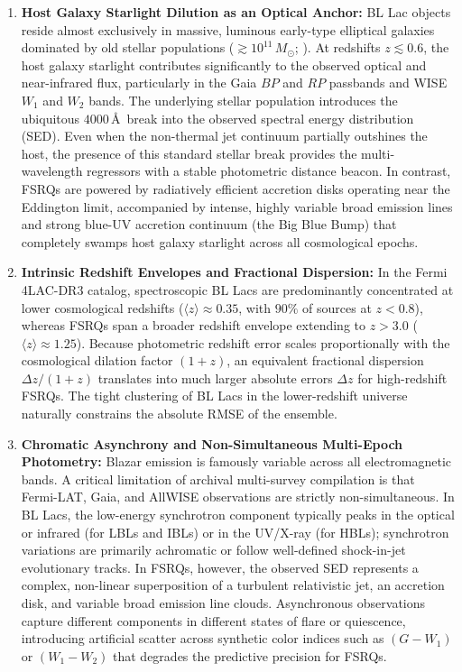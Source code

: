 \documentclass[twocolumn,linenumbers,floatfix]{aastex701}
\begin{document}
\begin{enumerate}
    \item \textbf{Host Galaxy Starlight Dilution as an Optical Anchor:} BL Lac objects reside almost exclusively in massive, luminous early-type elliptical galaxies dominated by old stellar populations ($\gtrsim 10^{11}\,M_\odot$; \citealt{Urry1995, Falomo2014}). At redshifts $z \lesssim 0.6$, the host galaxy starlight contributes significantly to the observed optical and near-infrared flux, particularly in the Gaia $BP$ and $RP$ passbands and WISE $W_1$ and $W_2$ bands. The underlying stellar population introduces the ubiquitous $4000$\,\AA\ break into the observed spectral energy distribution (SED). Even when the non-thermal jet continuum partially outshines the host, the presence of this standard stellar break provides the multi-wavelength regressors with a stable photometric distance beacon. In contrast, FSRQs are powered by radiatively efficient accretion disks operating near the Eddington limit, accompanied by intense, highly variable broad emission lines and strong blue-UV accretion continuum (the Big Blue Bump) that completely swamps host galaxy starlight across all cosmological epochs.
    
    \item \textbf{Intrinsic Redshift Envelopes and Fractional Dispersion:} In the Fermi 4LAC-DR3 catalog, spectroscopic BL Lacs are predominantly concentrated at lower cosmological redshifts ($\langle z \rangle \approx 0.35$, with $90\%$ of sources at $z < 0.8$), whereas FSRQs span a broader redshift envelope extending to $z > 3.0$ ($\langle z \rangle \approx 1.25$). Because photometric redshift error scales proportionally with the cosmological dilation factor $(1+z)$, an equivalent fractional dispersion $\Delta z / (1+z)$ translates into much larger absolute errors $\Delta z$ for high-redshift FSRQs. The tight clustering of BL Lacs in the lower-redshift universe naturally constrains the absolute RMSE of the ensemble.
    
    \item \textbf{Chromatic Asynchrony and Non-Simultaneous Multi-Epoch Photometry:} Blazar emission is famously variable across all electromagnetic bands. A critical limitation of archival multi-survey compilation is that Fermi-LAT, Gaia, and AllWISE observations are strictly non-simultaneous. In BL Lacs, the low-energy synchrotron component typically peaks in the optical or infrared (for LBLs and IBLs) or in the UV/X-ray (for HBLs); synchrotron variations are primarily achromatic or follow well-defined shock-in-jet evolutionary tracks. In FSRQs, however, the observed SED represents a complex, non-linear superposition of a turbulent relativistic jet, an accretion disk, and variable broad emission line clouds. Asynchronous observations capture different components in different states of flare or quiescence, introducing artificial scatter across synthetic color indices such as $(G - W_1)$ or $(W_1 - W_2)$ that degrades the predictive precision for FSRQs.
\end{enumerate}
\end{document}
